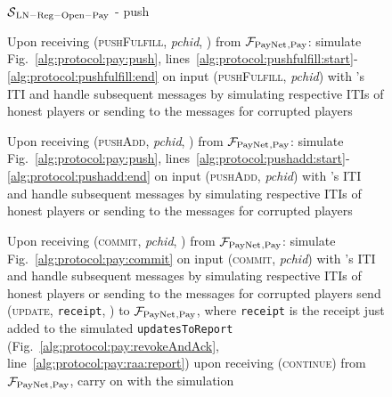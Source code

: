 \begin{figure}[!htbp]
  \begin{simulatorbox}{$\mathcal{S}{}_{\mathrm{LN - Reg - Open - Pay}}$ - push}
    \begin{algorithmic}[1]
      \State Upon receiving (\textsc{pushFulfill}, \textit{pchid}, \alice) from
      $\mathcal{F}_{\mathrm{PayNet}}{}_{\mathrm{, Pay}}$:
      \Indent
        \State simulate Fig.~\ref{alg:protocol:pay:push},
        lines~\ref{alg:protocol:pushfulfill:start}-\ref{alg:protocol:pushfulfill:end}
        on input (\textsc{pushFulfill}, \textit{pchid}) with \alice's ITI and
        handle subsequent messages by simulating respective ITIs of honest
        players or sending to \adversary{} the messages for corrupted players
        \label{alg:sim:push:fulfill}
      \EndIndent
      \Statex

      \State Upon receiving (\textsc{pushAdd}, \textit{pchid}, \alice) from
      $\mathcal{F}_{\mathrm{PayNet}}{}_{\mathrm{, Pay}}$:
      \Indent
        \State simulate Fig.~\ref{alg:protocol:pay:push},
        lines~\ref{alg:protocol:pushadd:start}-\ref{alg:protocol:pushadd:end} on
        input (\textsc{pushAdd}, \textit{pchid}) with \alice's ITI and handle
        subsequent messages by simulating respective ITIs of honest players or
        sending to \adversary{} the messages for corrupted players
        \label{alg:sim:push:add}
      \EndIndent
      \Statex

      \State Upon receiving (\textsc{commit}, \textit{pchid}, \alice) from
      $\mathcal{F}_{\mathrm{PayNet}}{}_{\mathrm{, Pay}}$:
      \Indent
        \State simulate Fig.~\ref{alg:protocol:pay:commit} on input
        (\textsc{commit}, \textit{pchid}) with \alice's ITI and handle
        subsequent messages by simulating respective ITIs of honest players or
        sending to \adversary{} the messages for corrupted players
        \label{alg:sim:push:commit}
          \State send (\textsc{update}, \texttt{receipt}, \alice) to
          $\mathcal{F}_{\mathrm{PayNet}}{}_{\mathrm{, Pay}}$, where \texttt{receipt} is the receipt
          just added to the simulated \texttt{updatesToReport}
          (Fig.~\ref{alg:protocol:pay:revokeAndAck},
          line~\ref{alg:protocol:pay:raa:report})
          \label{alg:sim:push:report}
          \State upon receiving (\textsc{continue}) from $\mathcal{F}_{\mathrm{PayNet}}{}_{\mathrm{,
          Pay}}$, carry on with the simulation
        \EndIf
      \EndIndent
    \end{algorithmic}
  \end{simulatorbox}
  \caption{}
  \label{alg:sim:push}
\end{figure}

